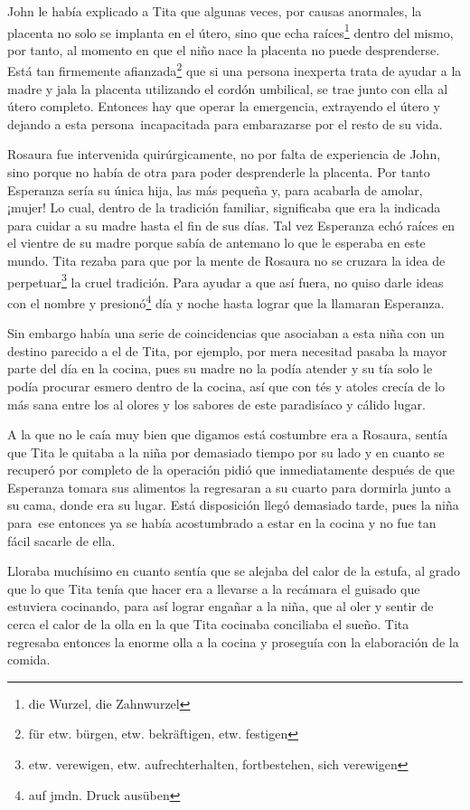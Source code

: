 John le había explicado a Tita que algunas veces, por causas anormales,
la placenta no solo se implanta en el útero, sino que echa raíces\footnote{die Wurzel, die Zahnwurzel}
dentro del mismo, por tanto, al momento en que el niño nace la placenta no
puede desprenderse. Está tan firmemente afianzada\footnote{für etw. bürgen, etw. bekräftigen, etw. festigen}
que si una persona inexperta trata de ayudar a la madre y jala
la placenta utilizando el cordón umbilical, se trae junto con ella al
útero completo. Entonces hay que operar la emergencia, extrayendo el
útero y dejando a esta persona~incapacitada para embarazarse por
el resto de su vida.

Rosaura fue intervenida quirúrgicamente, no por falta de experiencia de
John, sino porque no había de otra para poder desprenderle la
placenta. Por tanto Esperanza sería su única hija, las más pequeña y,
para acabarla de amolar, ¡mujer! Lo cual, dentro de la tradición
familiar, significaba que era la indicada para cuidar a su madre hasta
el fin de sus días. Tal vez Esperanza echó raíces en el vientre de su
madre porque sabía de antemano lo que le esperaba en este mundo. Tita
rezaba para que por la mente de Rosaura no se cruzara la idea de perpetuar\footnote{etw. verewigen, etw. aufrechterhalten, fortbestehen, sich verewigen}
la cruel tradición.
Para ayudar a que así fuera, no quiso darle ideas con el nombre y presionó\footnote{auf jmdn. Druck ausüben} día y noche
hasta lograr que la llamaran Esperanza.

Sin embargo había una serie de coincidencias que asociaban a esta niña
con un destino parecido a el de Tita, por ejemplo, por mera necesitad
pasaba la mayor parte del día en la cocina, pues su madre no la podía
atender y su tía solo le podía procurar esmero dentro de la cocina, así
que con tés y atoles crecía de lo más sana entre los al olores y los
sabores de este paradisíaco y cálido lugar.

A la que no le caía muy bien que digamos está costumbre era a Rosaura,
sentía que Tita le quitaba a la niña por demasiado tiempo por su lado y
en cuanto se recuperó por completo de la operación pidió que
inmediatamente después de que Esperanza tomara sus alimentos la
regresaran a su cuarto para dormirla junto a su cama, donde era su
lugar. Está disposición llegó demasiado tarde, pues la niña para~ese entonces ya se había acostumbrado a estar en la cocina y no fue tan
fácil sacarle de ella.

Lloraba muchísimo en cuanto sentía que se alejaba del calor de la
estufa, al grado que lo que Tita tenía que hacer era a llevarse a la
recámara el guisado que estuviera cocinando, para así lograr engañar a
la niña, que al oler y sentir de cerca el calor de la olla en la que
Tita cocinaba conciliaba el sueño. Tita regresaba entonces la enorme
olla a la cocina y proseguía con la elaboración de la comida.

